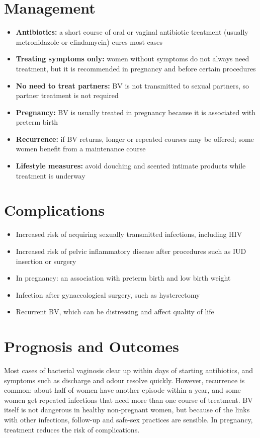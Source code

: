 \section*{Management}
\begin{itemize}
    \item \textbf{Antibiotics:} a short course of oral or vaginal antibiotic treatment (usually metronidazole or clindamycin) cures most cases
    \item \textbf{Treating symptoms only:} women without symptoms do not always need treatment, but it is recommended in pregnancy and before certain procedures
    \item \textbf{No need to treat partners:} BV is not transmitted to sexual partners, so partner treatment is not required
    \item \textbf{Pregnancy:} BV is usually treated in pregnancy because it is associated with preterm birth
    \item \textbf{Recurrence:} if BV returns, longer or repeated courses may be offered; some women benefit from a maintenance course
    \item \textbf{Lifestyle measures:} avoid douching and scented intimate products while treatment is underway
\end{itemize}

\section*{Complications}
\begin{itemize}
    \item Increased risk of acquiring sexually transmitted infections, including HIV
    \item Increased risk of pelvic inflammatory disease after procedures such as IUD insertion or surgery
    \item In pregnancy: an association with preterm birth and low birth weight
    \item Infection after gynaecological surgery, such as hysterectomy
    \item Recurrent BV, which can be distressing and affect quality of life
\end{itemize}

\section*{Prognosis and Outcomes}
Most cases of bacterial vaginosis clear up within days of starting antibiotics, and symptoms such as discharge and odour resolve quickly. However, recurrence is common: about half of women have another episode within a year, and some women get repeated infections that need more than one course of treatment. BV itself is not dangerous in healthy non-pregnant women, but because of the links with other infections, follow-up and safe-sex practices are sensible. In pregnancy, treatment reduces the risk of complications.

